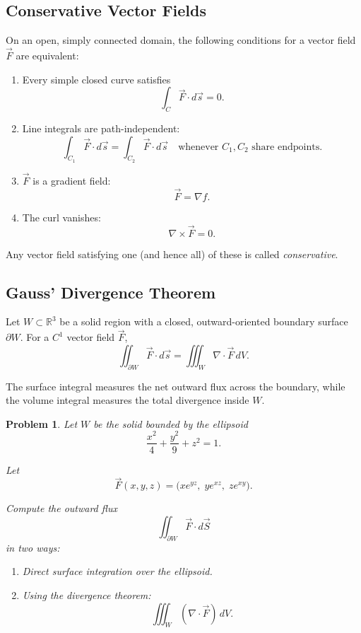 \documentclass{article}
\newtheorem{problem}{Problem}
\begin{document}
\subsection{Conservative Vector Fields}

On an open, simply connected domain, the following conditions for a vector field \(\vec{F}\) are equivalent:

\begin{enumerate}
    \item Every simple closed curve satisfies  
    \[
    \int_C \vec{F}\cdot d\vec{s} = 0.
    \]

    \item Line integrals are path-independent:
    \[
    \int_{C_1} \vec{F}\cdot d\vec{s}
    =
    \int_{C_2} \vec{F}\cdot d\vec{s}
    \quad \text{whenever } C_1,C_2 \text{ share endpoints}.
    \]

    \item \(\vec{F}\) is a gradient field:
    \[
    \vec{F} = \nabla f.
    \]

    \item The curl vanishes:
    \[
    \nabla \times \vec{F} = 0.
    \]
\end{enumerate}

Any vector field satisfying one (and hence all) of these is called \textit{conservative}.

\subsection{Gauss' Divergence Theorem}

Let \(W\subset \mathbb{R}^3\) be a solid region with a closed, outward-oriented boundary surface \(\partial W\).  
For a \(C^1\) vector field \(\vec{F}\),
\[
\iint_{\partial W} \vec{F}\cdot d\vec{s}
=
\iiint_W \nabla \cdot \vec{F}\, dV.
\]

The surface integral measures the net outward flux across the boundary, while the volume integral measures the total divergence inside \(W\).

\begin{problem}
Let $W$ be the solid bounded by the ellipsoid
\[
\frac{x^2}{4} + \frac{y^2}{9} + z^2 = 1.
\]

Let
\[
\vec{F}(x,y,z) =
\big( x e^{yz},\; y e^{xz},\; z e^{xy} \big).
\]

Compute the outward flux
\[
\iint_{\partial W} \vec{F}\cdot d\vec{S}
\]
in two ways:

\begin{enumerate}
    \item Direct surface integration over the ellipsoid.
    \item Using the divergence theorem:
    \[
    \iiint_W (\nabla\cdot \vec{F})\, dV.
    \]
\end{enumerate}
\end{problem}
\end{document}
